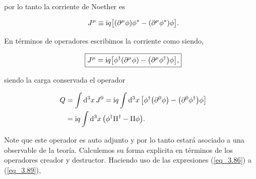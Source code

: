 por lo tanto la corriente de Noether es

\begin{equation}
    J^\mu \equiv \mathrm{i} q \qty\big[\qty(\partial^\mu \phi)\phi^* -\qty(\partial^\mu \phi^*)\phi ].
\end{equation}

En términos de operadores escribimos la corriente como siendo,

\newcommand{\OJ}{J}
\begin{equation}
\boxed{
    \OJ^\mu =  \ii q \qty\big[\Ophi^\dag \qty(\partial^\mu \Ophi) -\qty(\partial^\mu \Ophi^\dag)\Ophi],}
\end{equation}

siendo la carga conservada el operador 

\newcommand{\OQ}{Q}
\begin{equation}
\begin{split}
    \OQ &= \int \dd[3]{x} \OJ^0 = \ii q \int \dd[3]{x} \qty\big[\Ophi^\dag \qty(\partial^0 \Ophi) -\qty(\partial^0 \Ophi^\dag)\Ophi]\\
    &=\ii q \int \dd[3]{x} \qty\big(\Ophi^\dag \OPi^\dag - \OPi \Ophi).
\end{split}
\end{equation}

Note que este operador es auto adjunto y por lo tanto estará asociado a una observable de la teoría. Calculemos su forma explicita en términos de los operadores creador y destructor. Haciendo uso de las expresiones (\ref{eq_3.86}) a (\ref{eq_3.89}),

